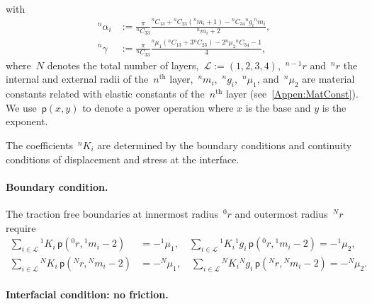 \documentclass[preprint,10pt,times]{elsarticle}
\numberwithin{equation}{section}
\newcommand{\pr}[1]{\left( #1 \right)}
\newcommand{\p}{\,\mathsf{p}}
\renewcommand{\>}{$\Rightarrow$}
\begin{document}
with
\begin{subequations}
	\begin{align}
	{}^{n}\!{\alpha_{i}} & := \frac{\pi}{{}^{n}\!{C_{33}}} \frac{  {}^{n}\!{C_{13}} + {}^{n}\!{C_{23}}({}^{n}\!{m_{i}} + 1) - {}^{n}\!{C_{34}} {}^{n}\!{g_{i}} {}^{n}\!{m_{i}} }{{}^{n}\!{m_{i}}+2}, \\
	{}^{n}\!\gamma & := \frac{\pi}{{}^{n}\!{C_{33}}} \frac{ {}^{n}\!{\mu_{1}} ({}^{n}\!{C_{13}} + 3{}^{n}\!{C_{23}}) - 2{}^{n}\!{\mu_{2}} {}^{n}\!{C_{34}} - 1  }{4},
	\end{align}
\end{subequations}
where~$N$ denotes the total number of layers,~$\mathcal{L} := \pr{1,2,3,4}$,~${}^{n-1}\!{r}$ and~${}^{n}\!{r}$ the internal and external radii of the~$n^\text{th}$ layer,~${}^{n}\!{m_{i}}$,~${}^{n}\!{g_{i}}$,~${}^{n}\!{\mu_{1}}$, and~${}^{n}\!{\mu_{2}}$ are material constants related with elastic constants of the~$n^\text{th}$ layer (see~\ref{Appen:MatConst}). We use $\p\pr{x,y}$ to denote a power operation where $x$ is the base and $y$ is the exponent.

The coefficients~${}^{n}\!{K_{i}}$ are determined by the boundary conditions and continuity conditions of displacement and stress at the interface.

\paragraph{Boundary condition.}

The traction free boundaries at innermost radius~${}^{0}\!{r}$ and outermost radius~${}^{N}\!{r}$ require
\begin{subequations}
	\begin{align}
	\sum_{i \in \mathcal{L}} {}^{1}\!{K_{i}} \p\pr{{}^{0}\!{r},{}^{1}\!{m_{i}} - 2} & = -{}^{1}\!{\mu_{1}}, \quad
	\sum_{i \in \mathcal{L}} {}^{1}\!{K_{i}} {}^{1}\!{g_{i}} \p\pr{{}^{0}\!{r},{}^{1}\!{m_{i}} - 2} = -{}^{1}\!{\mu_{2}},\\
	\sum_{i \in \mathcal{L}} {}^{N}\!{K_{i}} \p\pr{{}^{N}\!{r},{}^{N}\!{m_{i}} - 2} & = -{}^{N}\!{\mu_{1}}, \quad
	\sum_{i \in \mathcal{L}} {}^{N}\!{K_{i}} {}^{N}\!{g_{i}} \p\pr{{}^{N}\!{r},{}^{N}\!{m_{i}} - 2} = -{}^{N}\!{\mu_{2}}.
	\end{align}
	\label{eq:boundary}
\end{subequations}

\paragraph{Interfacial condition: no friction.}
\end{document}
